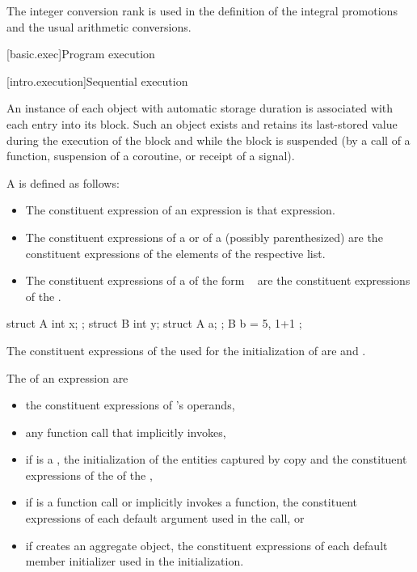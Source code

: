 \begin{note}
The integer conversion rank is used in the definition of the integral
promotions and the usual arithmetic
conversions.
\end{note}

[basic.exec]{Program execution}

[intro.execution]{Sequential execution}

\pnum
An instance of each object with automatic storage
duration is associated with each entry into its
block. Such an object exists and retains its last-stored value during
the execution of the block and while the block is suspended (by a call
of a function, suspension of a coroutine, or receipt of a signal).

\pnum
A  is defined as follows:
\begin{itemize}
\item
The constituent expression of an expression is that expression.
\item
The constituent expressions of a  or
of a (possibly parenthesized) 
are the constituent expressions of the elements of the respective list.
\item
The constituent expressions of a 
of the form \tcode{=}~
are the constituent expressions of the .
\end{itemize}
\begin{example}
\begin{codeblock}
struct A { int x; };
struct B { int y; struct A a; };
B b = { 5, { 1+1 } };
\end{codeblock}
The constituent expressions of the 
used for the initialization of  are  and .
\end{example}

\pnum
The  of an expression  are
\begin{itemize}
\item
the constituent expressions of 's operands,
\item
any function call that  implicitly invokes,
\item
if  is a ,
the initialization of the entities captured by copy and
the constituent expressions of the  of the ,
\item
if  is a function call or implicitly invokes a function,
the constituent expressions of each default argument
used in the call, or
\item
if  creates an aggregate object,
the constituent expressions of each default member initializer
used in the initialization.
\end{itemize}

